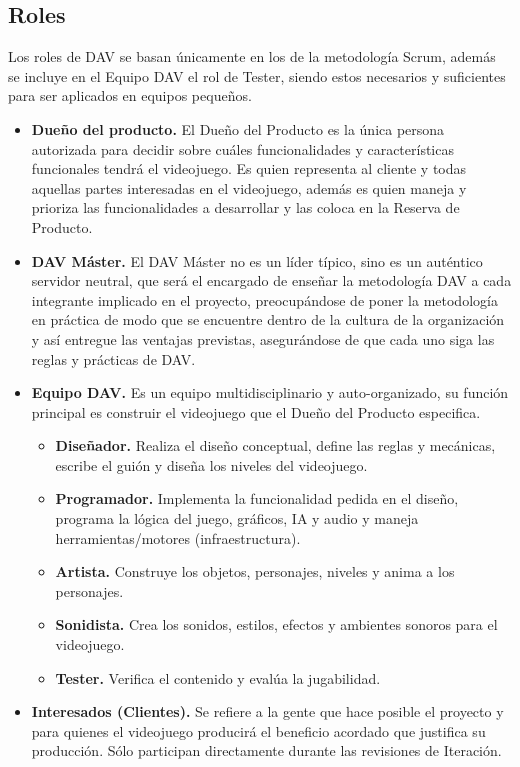 \documentclass[a4paper, openright, 12pt]{report}
\begin{document}
\subsection*{Roles}
\justify
Los roles de DAV se basan únicamente en los de la metodología Scrum, además se incluye en el Equipo DAV el rol de Tester, siendo estos necesarios y suficientes para ser aplicados en equipos pequeños. \cite{Implementacion2011} 
\begin{itemize}
\item \textbf{Dueño del producto.} El Dueño del Producto es la única persona autorizada para decidir sobre cuáles funcionalidades y características funcionales tendrá el videojuego. Es quien representa al cliente y todas aquellas partes interesadas en el videojuego, además es quien maneja y prioriza las funcionalidades a desarrollar y las coloca en la Reserva de Producto. \cite{Implementacion2011} 
\item \textbf{DAV Máster.} El DAV Máster no es un líder típico, sino es un auténtico servidor neutral, que será el encargado de enseñar la metodología DAV a cada integrante implicado en el proyecto, preocupándose de poner la metodología en práctica de modo que se encuentre dentro de la cultura de la organización y así entregue las ventajas previstas, asegurándose de que cada uno siga las reglas y prácticas de DAV. \cite{Implementacion2011}
\item \textbf{Equipo DAV.} Es un equipo multidisciplinario y auto-organizado, su función principal es construir el videojuego que el Dueño del Producto especifica. \cite{Implementacion2011}
\begin{itemize}
\item \textbf{Diseñador.} Realiza el diseño conceptual, define las reglas y mecánicas, escribe el guión y diseña los niveles del videojuego. \cite{Implementacion2011}
\item \textbf{Programador.} Implementa la funcionalidad pedida en el diseño, programa la lógica del juego, gráficos, IA y audio y maneja herramientas/motores (infraestructura). \cite{Implementacion2011}
\item \textbf{Artista.} Construye los objetos, personajes, niveles y anima a los personajes. \cite{Implementacion2011}
\item \textbf{Sonidista.} Crea los sonidos, estilos, efectos y ambientes sonoros para el videojuego. \cite{Implementacion2011}
\item \textbf{Tester.} Verifica el contenido y evalúa la jugabilidad. \cite{Implementacion2011}
\end{itemize}
\item \textbf{Interesados (Clientes).} Se refiere a la gente que hace posible el proyecto y para quienes el videojuego producirá el beneficio acordado que justifica su producción. Sólo participan directamente durante las revisiones de Iteración. \cite{Implementacion2011}
\end{itemize}
\end{document}
